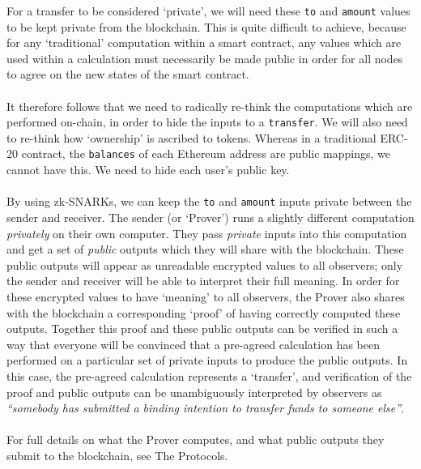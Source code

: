 \documentclass{article}
\begin{document}
\noindent
For a transfer to be considered `private', we will need these \texttt{to} and \texttt{amount} values to be kept private from the blockchain. This is quite difficult to achieve, because for any `traditional' computation within a smart contract, any values which are used within a calculation must necessarily be made public in order for all nodes to agree on the new states of the smart contract.\\
\\
It therefore follows that we need to radically re-think the computations which are performed on-chain, in order to hide the inputs to a \texttt{transfer}. We will also need to re-think how `ownership' is ascribed to tokens. Whereas in a traditional ERC-20 contract, the \texttt{balances} of each Ethereum address are public mappings, we cannot have this. We need to hide each user's public key.\\
\\
By using zk-SNARKs, we can keep the \texttt{to} and \texttt{amount} inputs private between the sender and receiver. The sender (or `Prover') runs a slightly different computation \textit{privately} on their own computer. They pass \textit{private} inputs into this computation and get a set of \textit{public} outputs which they will share with the blockchain. These public outputs will appear as unreadable encrypted values to all observers; only the sender and receiver will be able to interpret their full meaning. In order for these encrypted values to have `meaning' to all observers, the Prover also shares with the blockchain a corresponding `proof' of having correctly computed these outputs. Together this proof and these public outputs can be verified in such a way that everyone will be convinced that a pre-agreed calculation has been performed on a particular set of private inputs to produce the public outputs. In this case, the pre-agreed calculation represents a `transfer', and verification of the proof and public outputs can be unambiguously interpreted by observers as \textit{``somebody has submitted a binding intention to transfer funds to someone else''}.\\
\\
For full details on what the Prover computes, and what public outputs they submit to the blockchain, see The Protocols.
\end{document}
